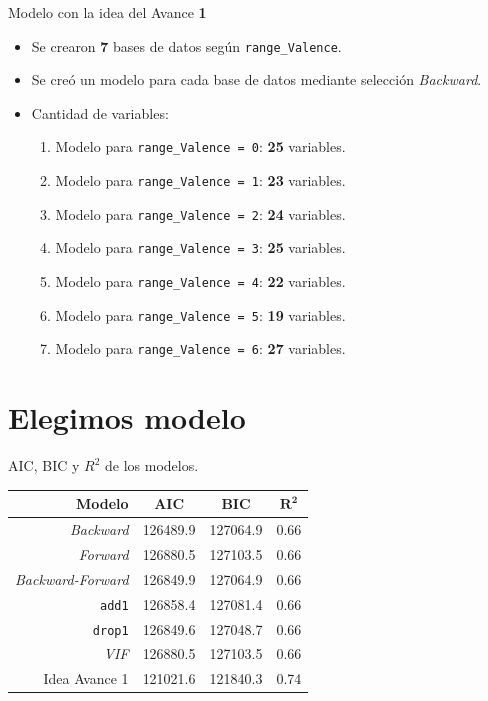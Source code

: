 \documentclass[11pt]{beamer}
\newcommand{\cod}[1]{\texttt{\frenchspacing#1}}
\begin{document}
\begin{frame}{Modelo con la idea del Avance \textbf{1}}
	\begin{itemize}
		\item Se crearon \textbf{7} bases de datos según \cod{range\_Valence}.
		\pause
		\item Se creó un modelo para cada base de datos mediante selección \textit{Backward}.
		\pause
		\item Cantidad de variables:
		\begin{enumerate}
			\item Modelo para \cod{range\_Valence = 0}: \textbf{25} variables.
			\item Modelo para \cod{range\_Valence = 1}: \textbf{23} variables.
			\item Modelo para \cod{range\_Valence = 2}: \textbf{24} variables.
			\item Modelo para \cod{range\_Valence = 3}: \textbf{25} variables.
			\item Modelo para \cod{range\_Valence = 4}: \textbf{22} variables.
			\item Modelo para \cod{range\_Valence = 5}: \textbf{19} variables.
			\item Modelo para \cod{range\_Valence = 6}: \textbf{27} variables.
		\end{enumerate}
	\end{itemize}
\end{frame}

\section{Elegimos modelo}

\begin{frame}{AIC, BIC y $R^2$ de los modelos.}
		\begin{center}
			\begin{tabular}{| r | c | c | c |}
				\hline
				\textbf{Modelo} & \textbf{AIC} & \textbf{BIC} & $\mathbf{R^2}$
				\\ \hline
				\textit{Backward} & 126489.9 &  127064.9 & 0.66 \\
				\textit{Forward} & 126880.5 & 127103.5 & 0.66 \\
				\textit{Backward-Forward} & 126849.9 & 127064.9 & 0.66\\
				\cod{add1} & 126858.4 &  127081.4& 0.66\\
				\cod{drop1} & 126849.6 & 127048.7 & 0.66\\
				\textit{VIF} & 126880.5 & 127103.5 & 0.66 \\ 
				Idea Avance 1 & 121021.6 & 121840.3 & 0.74
				\\ \hline
			\end{tabular}
		\end{center}
\end{frame}
\end{document}
